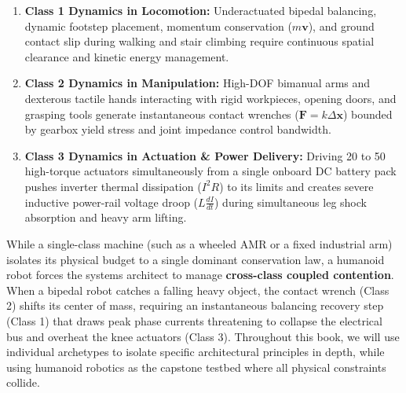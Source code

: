 \documentclass[
  10pt,
  letterpaper,
  twoside,
  openright,
  numbers=noenddot,
  headings=standardclasses
]{scrbook}
\begin{document}
\begin{enumerate}
\def\labelenumi{\arabic{enumi}.}
\tightlist
\item
  \textbf{Class 1 Dynamics in Locomotion:} Underactuated bipedal
  balancing, dynamic footstep placement, momentum conservation
  (\(m\mathbf{v}\)), and ground contact slip during walking and stair
  climbing require continuous spatial clearance and kinetic energy
  management.
\item
  \textbf{Class 2 Dynamics in Manipulation:} High-DOF bimanual arms and
  dexterous tactile hands interacting with rigid workpieces, opening
  doors, and grasping tools generate instantaneous contact wrenches
  (\(\mathbf{F} = k \Delta \mathbf{x}\)) bounded by gearbox yield stress
  and joint impedance control bandwidth.
\item
  \textbf{Class 3 Dynamics in Actuation \& Power Delivery:} Driving 20
  to 50 high-torque actuators simultaneously from a single onboard DC
  battery pack pushes inverter thermal dissipation (\(I^2 R\)) to its
  limits and creates severe inductive power-rail voltage droop
  (\(L \frac{dI}{dt}\)) during simultaneous leg shock absorption and
  heavy arm lifting.
\end{enumerate}

While a single-class machine (such as a wheeled AMR or a fixed
industrial arm) isolates its physical budget to a single dominant
conservation law, a humanoid robot forces the systems architect to
manage \textbf{cross-class coupled contention}. When a bipedal robot
catches a falling heavy object, the contact wrench (Class 2) shifts its
center of mass, requiring an instantaneous balancing recovery step
(Class 1) that draws peak phase currents threatening to collapse the
electrical bus and overheat the knee actuators (Class 3). Throughout
this book, we will use individual archetypes to isolate specific
architectural principles in depth, while using humanoid robotics as the
capstone testbed where all physical constraints collide.
\end{document}
